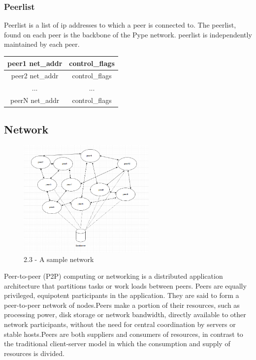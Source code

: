 \documentclass[a4paper,11pt]{article}
\begin{document}
\subsubsection{Peerlist}
Peerlist is a list of ip addresses to which a peer is connected to. The peerlist, found on each peer is the backbone of the Pype network. peerlist is independently maintained by each peer.
\begin{center}
  \begin{tabular}{ | c | c | }
    \hline
    peer1 net\_addr & control\_flags\\
    \hline
    peer2 net\_addr & control\_flags\\
    \hline
    ... & ...\\
    \hline
    peerN net\_addr & control\_flags\\
    \hline
  \end{tabular}
\end{center}



\subsection{Network}


\begin{figure}[H]
\begin{center}
  \includegraphics[width=0.60\textwidth]{images/network.png}
  \caption{2.3 - A sample network}
\end{center}
\end{figure}


Peer-to-peer (P2P) computing or networking is a distributed application architecture that partitions tasks or work loads between peers. Peers are equally privileged, equipotent participants in the application. They are said to form a peer-to-peer network of nodes.Peers make a portion of their resources, such as processing power, disk storage or network bandwidth, directly available to other network participants, without the need for central coordination by servers or stable hosts.Peers are both suppliers and consumers of resources, in contrast to the traditional client-server model in which the consumption and supply of resources is divided.
\end{document}
